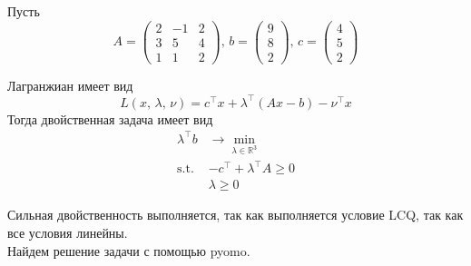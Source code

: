\documentclass{article}
\newcommand*{\R}{\mathbb{R}}
\renewcommand*{\st}{\text{s.t. }}
\newcommand*{\1}{\mathbf{1}}
\begin{document}
\noindent
Пусть
\[ A = \begin{pmatrix} 2&-1&2\\ 3&5&4\\ 1&1&2 \end{pmatrix},\, b = \begin{pmatrix}
    9 \\ 8 \\ 2
\end{pmatrix},\, c = \begin{pmatrix}
    4 \\ 5 \\ 2
\end{pmatrix} \]

\noindent
Лагранжиан имеет вид
\[ L(x,\, \lambda,\, \nu) = c^\top x + \lambda^\top (Ax - b) - \nu^\top x \]
Тогда двойственная задача имеет вид
\[ \begin{split} 
    \lambda^\top b &\to \min\limits_{\lambda \in \R^3} \\
    \st & -c^\top + \lambda^\top A \geqslant 0 \\
    &\lambda \geqslant 0
\end{split} \]

\noindent
Сильная двойственность выполняется, так как выполняется условие LCQ, так как все условия линейны. \\ Найдем решение задачи с помощью pyomo.
\end{document}
